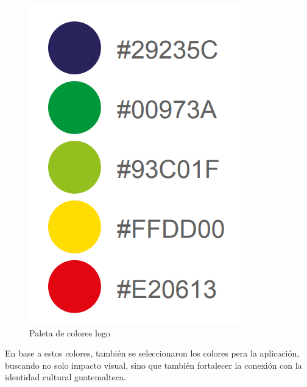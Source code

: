 \begin{figure} [H]
    \centering
    \includegraphics[width=0.25\linewidth]{figuras/paleta_colores_logo.png}
    \caption{Paleta de colores logo}
    \label{fig:enter-label}
\end{figure}


En base a estos colores, también se seleccionaron los colores pera la aplicación, buscando no solo impacto visual, sino que también  fortalecer la conexión con la identidad cultural guatemalteca.

